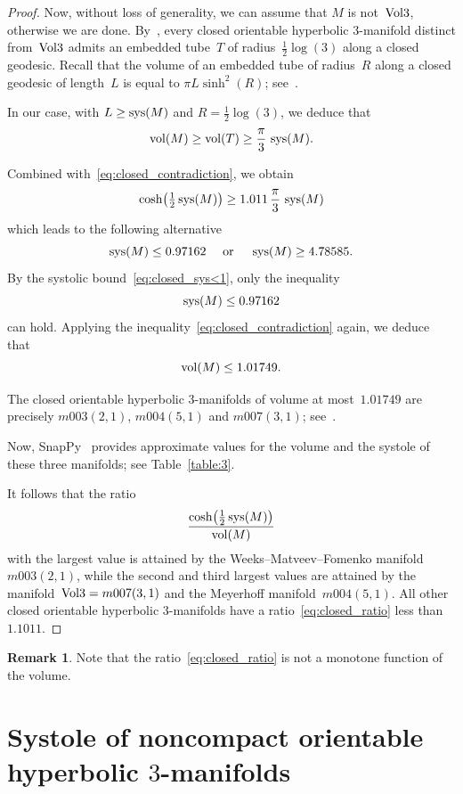 \documentclass[11pt,reqno]{amsart}
\theoremstyle{definition}
\newtheorem{remark}[theorem]{Remark}
\numberwithin{equation}{section}
\DeclareMathOperator{\vol}{{\rm vol}}
\DeclareMathOperator{\sys}{{\rm sys}}
\numberwithin{equation}{section}
\begin{document}
\begin{proof}
Now, without loss of generality, we can assume that $M$ is not~${\rm Vol}3$, otherwise we are done.
By~\cite{GT15}, every closed orientable hyperbolic $3$-manifold distinct from~${\rm Vol}3$ admits an embedded tube~$T$ of radius~$\frac{1}{2} \log(3)$ along a closed geodesic.
Recall that the volume of an embedded tube of radius~$R$ along a closed geodesic of length~$L$ is equal to $\pi  L  \sinh^2(R)$; see~\cite[\S IX.3]{fenchel}.

In our case, with $L \geq \sys(M)$ and $R=\frac{1}{2} \log(3)$, we deduce that
\[
\vol(M) \geq \vol(T) \geq \frac{\pi}{3} \, \sys(M).
\]

Combined with~\eqref{eq:closed_contradiction}, we obtain
\[
\cosh \!\left(\tfrac{1}{2} \sys(M) \right) \geq 1.011 \, \frac{\pi}{3} \, \sys(M)
\]
which leads to the following alternative
\[
\sys(M) \leq  0.97162 \quad \mbox{ or } \quad \sys(M)  \geq 4.78585.
\]
By the systolic bound~\eqref{eq:closed_sys<1}, only the inequality
\[
\sys(M) \leq  0.97162
\]
can hold.
Applying the inequality~\eqref{eq:closed_contradiction} again, we deduce that
\[
\vol(M) \leq 1.01749.
\]

The closed orientable hyperbolic $3$-manifolds of volume at most~$1.01749$ are precisely $m003(2,1)$, $m004(5,1)$ and $m007(3,1)$; see~\cite{GHMTY}.

Now, SnapPy~\cite{snappy} provides approximate values for the volume and the systole of these three manifolds; see Table~\ref{table:3}.


It follows that the ratio
\begin{equation} \label{eq:closed_ratio}
\frac{\cosh \!\left(\tfrac{1}{2} \sys(M) \right)}{\vol(M)}
\end{equation}
with the largest value is attained by the Weeks--Matveev--Fomenko manifold~$m003(2,1)$, while the second and third largest values are attained by the manifold~${\rm Vol}3=m007(3,1)$ and the Meyerhoff manifold~$m004(5,1)$.
All other closed orientable hyperbolic $3$-manifolds have a ratio~\eqref{eq:closed_ratio} less than~$1.1011$.
\end{proof}

\begin{remark}
Note that the ratio~\eqref{eq:closed_ratio} is not a monotone function of the volume.
\end{remark}



\section{Systole of noncompact orientable hyperbolic \texorpdfstring{$3$}{3}-manifolds}
\end{document}
